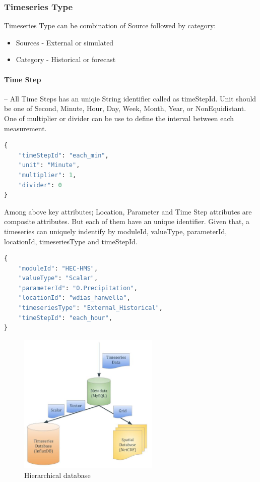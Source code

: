 \subsubsection{Timeseries Type}
Timeseries Type can be combination of Source followed by category:
\begin{itemize}
  \item Sources - External or simulated
  \item Category - Historical or forecast
\end{itemize}

\paragraph{Time Step}-- All Time Steps has an uniqie String identifier called as timeStepId. Unit should be one of Second, Minute, Hour, Day, Week, Month, Year, or NonEquidistant. One of multiplier or divider can be use to define the interval between each measurement.
\begin{lstlisting}[language=Python]
{
    "timeStepId": "each_min",
    "unit": "Minute",
    "multiplier": 1,
    "divider": 0
}
\end{lstlisting}

Among above key attributes; Location, Parameter and Time Step attributes are composite attributes. But each of them have an unique identifier.
Given that, a timeseries can uniquely indentify by moduleId, valueType, parameterId, locationId, timeseriesType and timeStepId.
\begin{lstlisting}[language=Python]
{
	"moduleId": "HEC-HMS",
	"valueType": "Scalar",
	"parameterId": "O.Precipitation",
	"locationId": "wdias_hanwella",
	"timeseriesType": "External_Historical",
	"timeStepId": "each_hour",
}
\end{lstlisting}

\begin{figure}[htp]
    \centering
    \includegraphics[width=0.6\textwidth]{method/microservice/hierarchical_database.jpg}
    \caption{Hierarchical database}
    \label{fi:hierarchical_database}
\end{figure}


